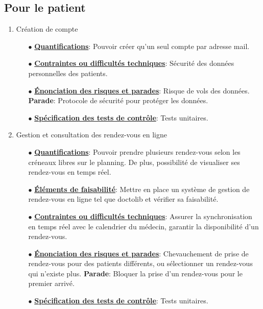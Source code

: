 \documentclass[a4paper]{book}
\begin{document}
\subsection{Pour le patient}
\begin{enumerate}
    \item Création de compte\newline
        \begin{itemize}
            \item[$\bullet$] \textbf{\underline{Quantifications}}: Pouvoir créer qu’un seul compte par adresse mail.
            \item[$\bullet$] \textbf{\underline{Contraintes ou difficultés techniques}}: Sécurité des données personnelles des patients.
            \item[$\bullet$] \textbf{\underline{Énonciation des risques et parades}}: Risque de vols des données.\newline
            \textbf{Parade}: Protocole de sécurité pour protéger les données.
            \item[$\bullet$] \textbf{\underline{Spécification des tests de contrôle}}: Tests unitaires.\newline
        \end{itemize}

    \item Gestion et consultation des rendez-vous en ligne\newline
    \begin{itemize}
        \item[$\bullet$] \textbf{\underline{Quantifications}}: Pouvoir prendre plusieurs rendez-vous selon les créneaux libres sur le planning. 
        De plus, possibilité de visualiser ses rendez-vous en temps réel.
        \item[$\bullet$] \textbf{\underline{Éléments de faisabilité}}: Mettre en place un système de gestion de rendez-vous en ligne tel que doctolib et vérifier sa faisabilité.
        \item[$\bullet$] \textbf{\underline{Contraintes ou difficultés techniques}}: Assurer la synchronisation en temps réel avec le calendrier du médecin, garantir la disponibilité d’un rendez-vous.
        \item[$\bullet$] \textbf{\underline{Énonciation des risques et parades}}: Chevauchement de prise de rendez-vous pour des patients différents, ou sélectionner un rendez-vous qui n'existe plus.\newline
        \textbf{Parade}: Bloquer la prise d’un rendez-vous pour le premier arrivé.
        \item[$\bullet$] \textbf{\underline{Spécification des tests de contrôle}}: Tests unitaires.
    \end{itemize}
        
\end{enumerate}
\end{document}
